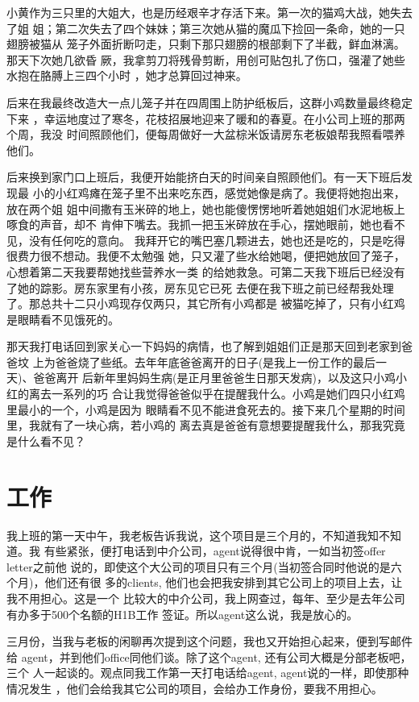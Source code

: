\documentclass[12pt]{book}
\begin{document}
小黄作为三只里的大姐大，也是历经艰辛才存活下来。第一次的猫鸡大战，她失去了姐
姐；第二次失去了四个妹妹；第三次她从猫的魔瓜下捡回一条命，她的一只翅膀被猫从
笼子外面折断叼走，只剩下那只翅膀的根部剩下了半截，鲜血淋漓。那天下次她几欲昏
厥，我拿剪刀将残骨剪断，用创可贴包扎了伤口，强灌了她些水抱在胳膊上三四个小时
，她才总算回过神来。

后来在我最终改造大一点儿笼子并在四周围上防护纸板后，这群小鸡数量最终稳定下来
，幸运地度过了寒冬，花枝招展地迎来了暖和的春夏。在小公司上班的那两个周，我没
时间照顾他们，便每周做好一大盆棕米饭请房东老板娘帮我照看喂养他们。

后来换到家门口上班后，我便开始能挤白天的时间亲自照顾他们。有一天下班后发现最
小的小红鸡瘫在笼子里不出来吃东西，感觉她像是病了。我便将她抱出来，放在两个姐
姐中间撒有玉米碎的地上，她也能傻愣愣地听着她姐姐们水泥地板上啄食的声音，却不
肯伸下嘴去。我抓一把玉米碎放在手心，摆她眼前，她也看不见，没有任何吃的意向。
我拜开它的嘴巴塞几颗进去，她也还是吃的，只是吃得很费力很不想动。我便不太勉强
她，只又灌了些水给她喝，便把她放回了笼子，心想着第二天我要帮她找些营养水一类
的给她救急。可第二天我下班后已经没有了她的踪影。房东家里有小孩，房东见它已死
去便在我下班之前已经帮我处理了。那总共十二只小鸡现存仅两只，其它所有小鸡都是
被猫吃掉了，只有小红鸡是眼睛看不见饿死的。

那天我打电话回到家关心一下妈妈的病情，也了解到姐姐们正是那天回到老家到爸爸坟
上为爸爸烧了些纸。去年年底爸爸离开的日子(是我上一份工作的最后一天)、爸爸离开
后新年里妈妈生病(是正月里爸爸生日那天发病)，以及这只小鸡小红的离去一系列的巧
合让我觉得爸爸似乎在提醒我什么。小鸡是她们四只小红鸡里最小的一个，小鸡是因为
眼睛看不见不能进食死去的。接下来几个星期的时间里，我就有了一块心病，若小鸡的
离去真是爸爸有意想要提醒我什么，那我究竟是什么看不见？
\section{工作}
\label{sec-9-51}

我上班的第一天中午，我老板告诉我说，这个项目是三个月的，不知道我知不知道。我
有些紧张，便打电话到中介公司，agent说得很中肯，一如当初签offer letter之前他
说的，即使这个大公司的项目只有三个月(当初签合同时他说的是六个月)，他们还有很
多的clients, 他们也会把我安排到其它公司上的项目上去，让我不用担心。这是一个
比较大的中介公司，我上网查过，每年、至少是去年公司有办多于500个名额的H1B工作
签证。所以agent这么说，我是放心的。

三月份，当我与老板的闲聊再次提到这个问题，我也又开始担心起来，便到写邮件给
agent，并到他们office同他们谈。除了这个agent, 还有公司大概是分部老板吧，三个
人一起谈的。观点同我工作第一天打电话给agent, agent说的一样，即使那种情况发生
，他们会给我其它公司的项目，会给办工作身份，要我不用担心。
\end{document}

